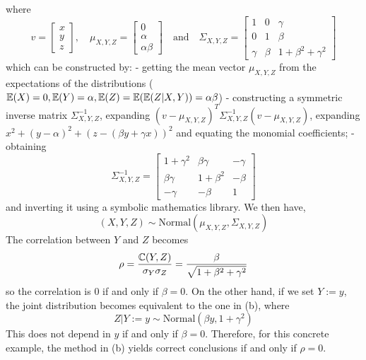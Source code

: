 where
\[
v = \begin{bmatrix}x \\ y \\ z\end{bmatrix},
\quad \mu_{X, Y, Z} = \begin{bmatrix}0 \\ \alpha \\ \alpha \beta \end{bmatrix}
\quad \text{and} \quad
\Sigma_{X, Y, Z} = \begin{bmatrix}
1 & 0 & \gamma \\
0 & 1 & \beta \\
\gamma & \beta & 1 + \beta^{2} + \gamma^{2}
\end{bmatrix}
\]
which can be constructed by: - getting the mean vector \(\mu_{X, Y, Z}\)
from the expectations of the distributions
(\(\operatorname{\mathbb{E}}(X) = 0, \operatorname{\mathbb{E}}(Y) = \alpha, \operatorname{\mathbb{E}}(Z) = \operatorname{\mathbb{E}}(\operatorname{\mathbb{E}}(Z | X, Y)) = \alpha \beta\))
- constructing a symmetric inverse matrix \(\Sigma_{X, Y, Z}^{-1}\),
expanding
\((v - \mu_{X, Y, Z})^T \Sigma_{X, Y, Z}^{-1} (v - \mu_{X, Y, Z})\),
expanding \(x^{2} + (y - \alpha)^{2} + (z - (\beta y + \gamma x))^{2}\) and
equating the monomial coefficients; - obtaining
\[
\Sigma_{X, Y, Z}^{-1} = \begin{bmatrix}
1 + \gamma^{2} & \beta \gamma & -\gamma \\
\beta \gamma & 1 + \beta^{2} & -\beta \\
-\gamma & -\beta & 1
\end{bmatrix}
\]
and inverting it using a symbolic mathematics library.
We then have,
\[
(X, Y, Z) \sim \text{Normal}(\mu_{X, Y, Z}, \Sigma_{X, Y, Z})
\]
The correlation between \(Y\) and \(Z\) becomes
\[
\rho = \frac{\operatorname{\mathbb{C}}(Y, Z)}{\sigma_Y \sigma_Z} = \frac{\beta}{\sqrt{1 + \beta^{2} + \gamma^{2}}}
\]
so the correlation is 0 if and only if \(\beta = 0\).
On the other hand, if we set \(Y := y\), the joint distribution becomes
equivalent to the one in (b), where
\[
Z | Y := y \sim \text{Normal}\left( \beta y, 1 + \gamma^{2}\right)
\]
This does not depend in \(y\) if and only if \(\beta = 0\).
Therefore, for this concrete example, the method in (b) yields correct
conclusions if and only if \(\rho = 0\).
